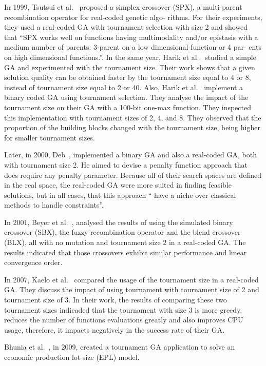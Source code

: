 In 1999, Tsutsui et al.~\cite{tsutsui1999multi} proposed a simplex crossover (SPX), a multi-parent recombination operator for real-coded genetic algo- rithms. For their experiments, they used a real-coded GA with tournament selection with size 2 and showed that ``SPX works well on functions having multimodality and/or epistasis with a medium number of parents: 3-parent on a low dimensional function or 4 par- ents on high dimensional functions.''. In the same year, Harik et al.~\cite{harik1999compact} studied a simple GA and experimented with the tournament size. Their work shows that a given solution quality can be obtained faster by the tournament size equal to 4 or 8, instead of tournament size equal to 2 or 40. Also, Harik et al.~\cite{harik1999gambler} implement a binary coded GA using tournament selection. They analyse the impact of the tournament size on their GA with a 100-bit one-max function. They inspected this implementation with tournament sizes of 2, 4, and 8. They observed that the proportion of the building blocks changed with the tournament size, being higher for smaller tournament sizes.

Later, in 2000, Deb~\cite{deb2000efficient}, implemented a binary GA and also a real-coded GA, both with tournament size 2. He aimed to devise a penalty function approach that does require any penalty parameter. Because all of their search spaces are defined in the real space, the real-coded GA were more suited in finding feasible solutions, but in all cases, that this approach `` have a niche over classical methods to handle constraints''.


In 2001, Beyer et al.~\cite{beyer2001self}, analysed the results of using the simulated binary crossover (SBX), the fuzzy recombination operator and the blend crossover (BLX), all with no mutation and tournament size 2 in a real-coded GA. The results indicated that those crossovers exhibit similar performance and linear convergence order.


In 2007, Kaelo et al.~\cite{kaelo2007integrated} compared the usage of the tournament size in a real-coded GA. They discuss the impact of using tournament with tournament size of 2 and tournament size of 3. In their work, the results of comparing these two tournament sizes indicaded that the tournament with size 3 is more greedy, reduces the number of functions evaluations greatly and also improves CPU usage, therefore, it impacts negatively in the success rate of their GA.

Bhunia et al.~\cite{bhunia2009application}, in 2009, created a tournament GA application to solve an economic production lot-size (EPL) model. 

